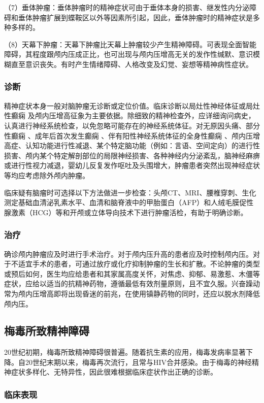 （7）垂体肿瘤：垂体肿瘤时的精神症状可由于垂体本身的损害、继发性内分泌障碍和垂体肿瘤扩展到蝶鞍区以外等因素所引起，因此，垂体肿瘤时的精神症状是多种多样的。

（8）天幕下肿瘤：天幕下肿瘤比天幕上肿瘤较少产生精神障碍。可表现全面智能障碍，其程度跟颅内压成正比，也可出现与颅内压增高无关的发作性缄默、意识模糊直至意识丧失。有时产生情绪障碍、人格改变及幻觉、妄想等精神病性症状。

\subsubsection{诊断}

精神症状本身一般对脑肿瘤无诊断或定位价值。临床诊断以局灶性神经体征或局灶性癫痫
及颅内压增高征象为主要依据。除细致的精神检查外，应详细询问病史，认真进行神经系统检查，以免忽略可能存在的神经系统体征。对无原因头痛、部分性癫痫
、成年后首次发生癫痫
、伴有阳性神经系统体征的全身性癫痫
、颅内压增高症、认知功能进行性减退、某个特定脑功能（例如：言语、空间定向）的进行性损害、颅内某个特定解剖部位的局限神经损害、各种神经内分泌紊乱，脑神经麻痹或进行性视力减退，婴幼儿反复发作呕吐及头围增大，肿瘤患者突然出现神经症状等均应考虑除外颅内肿瘤。

临床疑有脑瘤时可选择以下方法做进一步检查：头颅CT、MRI、腰椎穿刺、生化测定基础血清泌乳素水平、血清和脑脊液中的甲胎蛋白（AFP）和人绒毛膜促性腺激素（HCG）等和开颅或立体导向技术下进行肿瘤活检，有助于明确诊断。

\subsubsection{治疗}

确诊颅内肿瘤应及时进行手术治疗。对于颅内压升高的患者应及时控制颅内压。对于不适宜手术的患者，可通过放疗或化疗抑制肿瘤的生长和扩散。不论肿瘤的类型或预后如何，医生均应给患者和其家属高度关怀，对焦虑、抑郁、易激惹、木僵等症状，应给以适当的抗精神药物，遵循最低有效剂量原则，且不宜久服。兴奋躁动常为颅内压增高即将出现昏迷的前兆，在使用镇静药物的同时，还应以脱水剂降低颅内压。

\subsection{梅毒所致精神障碍}

20世纪初期，梅毒所致精神障碍很普遍。随着抗生素的应用，梅毒发病率显著下降。自20世纪末期以来，梅毒再次流行，且常与HIV合并感染。由于梅毒的神经精神症状多样化、无特异性，因此很难根据临床症状作出正确的诊断。

\subsubsection{临床表现}

